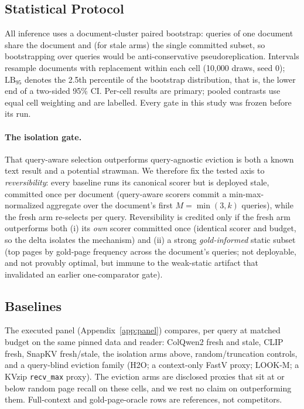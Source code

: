 \documentclass[letterpaper]{article} %
\newcommand{\lb}{\mathrm{LB}_{95}}
\begin{document}
\subsection{Statistical Protocol}\label{sec:setup-stats}
All inference uses a document-cluster paired bootstrap: queries of one document share the document and (for stale arms) the single committed subset, so bootstrapping over queries would be anti-conservative pseudoreplication. Intervals resample documents with replacement within each cell (10{,}000 draws, seed 0); $\lb$ denotes the 2.5th percentile of the bootstrap distribution, that is, the lower end of a two-sided 95\% CI. Per-cell results are primary; pooled contrasts use equal cell weighting and are labelled. Every gate in this study was frozen before its run.

\paragraph{The isolation gate.} That query-aware selection outperforms query-agnostic eviction is both a known text result \citep{tang2024quest} and a potential strawman. We therefore fix the tested axis to \emph{reversibility}: every baseline runs its canonical scorer but is deployed stale, committed once per document (query-aware scorers commit a min-max-normalized aggregate over the document's first $M=\min(3,k)$ queries), while the fresh arm re-selects per query. Reversibility is credited only if the fresh arm outperforms both (i) its \emph{own} scorer committed once (identical scorer and budget, so the delta isolates the mechanism) and (ii) a strong \emph{gold-informed} static subset (top pages by gold-page frequency across the document's queries; not deployable, and not provably optimal, but immune to the weak-static artifact that invalidated an earlier one-comparator gate).

\subsection{Baselines}
The executed panel (Appendix~\ref{app:panel}) compares, per query at matched budget on the same pinned data and reader: ColQwen2 \citep{faysse2025colpali} fresh and stale, CLIP \citep{radford2021clip} fresh, SnapKV fresh/stale, the isolation arms above, random/truncation controls, and a query-blind eviction family (H2O; a context-only FastV proxy; LOOK-M; a KVzip \texttt{recv\_max} proxy). The eviction arms are disclosed proxies that sit at or below random page recall on these cells, and we rest no claim on outperforming them. Full-context and gold-page-oracle rows are references, not competitors.
\end{document}
